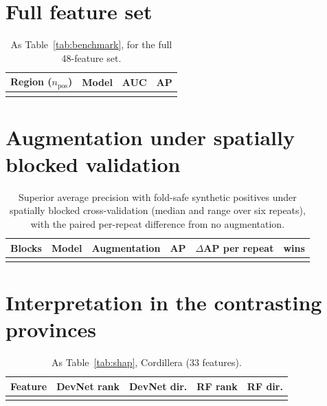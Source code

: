 \documentclass[pdflatex,sn-apa]{sn-jnl}
\begin{document}
\begin{appendices}

\section{Full feature set}\label{app:full}

\begin{table}[!h]
\caption{As Table~\ref{tab:benchmark}, for the full 48-feature set.}\label{tab:benchmark-full}
\footnotesize
\begin{tabular*}{\textwidth}{@{\extracolsep\fill}llcc}
\toprule
Region ($n_{\mathrm{pos}}$) & Model & AUC & AP \\
\midrule
\botrule
\end{tabular*}
\end{table}

\section{Augmentation under spatially blocked validation}\label{app:aug-spatial}

\begin{table}[!h]
\caption{Superior average precision with fold-safe synthetic positives under spatially blocked cross-validation (median and range over six repeats), with the paired per-repeat difference from no augmentation.}\label{tab:aug-spatial}
\footnotesize
\begin{tabular*}{\textwidth}{@{\extracolsep\fill}lllccc}
\toprule
Blocks & Model & Augmentation & AP & $\Delta$AP per repeat & wins \\
\midrule
\botrule
\end{tabular*}
\end{table}

\section{Interpretation in the contrasting provinces}\label{app:shap}

\begin{table}[!h]
\caption{As Table~\ref{tab:shap}, Cordillera (33 features).}\label{tab:shap-cord}
\footnotesize
\begin{tabular*}{\textwidth}{@{\extracolsep\fill}lcccc}
\toprule
Feature & DevNet rank & DevNet dir. & RF rank & RF dir. \\
\midrule
\botrule
\end{tabular*}
\end{table}


\end{appendices}
\end{document}
